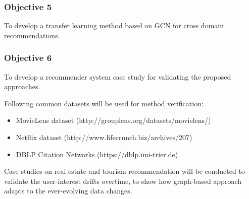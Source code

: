 


\subsubsection*{Objective 5}
To develop a transfer learning method based on GCN for cross domain recommendations.



\subsubsection*{Objective 6}
To develop a recommender system case study for validating the proposed approaches.

Following common datasets will be used for method verification: 

\begin{itemize}

\item MovieLens dataset (http://grouplens.org/datasets/movielens/) 

\item Netflix dataset (http://www.lifecrunch.biz/archives/207) 

\item DBLP Citation Networks (https://dblp.uni-trier.de)  

\end{itemize}

Case studies on real estate and tourism recommendation will be conducted to validate the user-interest drifts overtime, to show how graph-based approach adapts to the ever-evolving data changes. 
